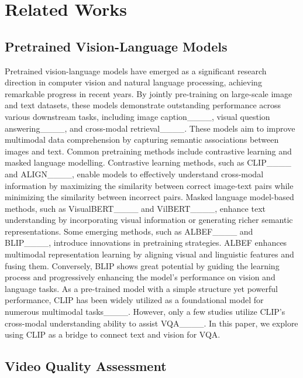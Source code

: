 \section{Related Works}
\subsection{Pretrained Vision-Language Models}

Pretrained vision-language models have emerged as a significant research direction in computer vision and natural language processing, achieving remarkable progress in recent years.
By jointly pre-training on large-scale image and text datasets, these models demonstrate outstanding performance across various downstream tasks, including image caption____, visual question answering____, and cross-modal retrieval____.
These models aim to improve multimodal data comprehension by capturing semantic associations between images and text. Common pretraining methods include contrastive learning and masked language modelling.
Contrastive learning methods, such as CLIP____ and ALIGN____, enable models to effectively understand cross-modal information by maximizing the similarity between correct image-text pairs while minimizing the similarity between incorrect pairs. 
Masked language model-based methods, such as VisualBERT____ and VilBERT____, enhance text understanding by incorporating visual information or generating richer semantic representations.
Some emerging methods, such as ALBEF____ and BLIP____, introduce innovations in pretraining strategies. ALBEF enhances multimodal representation learning by aligning visual and linguistic features and fusing them. Conversely, BLIP shows great potential by guiding the learning process and progressively enhancing the model’s performance on vision and language tasks.
As a pre-trained model with a simple structure yet powerful performance, CLIP has been widely utilized as a foundational model for numerous multimodal tasks____.
However, only a few studies utilize CLIP’s cross-modal understanding ability to assist VQA____. In this paper, we explore using CLIP as a bridge to connect text and vision for VQA.


\subsection{Video Quality Assessment}

